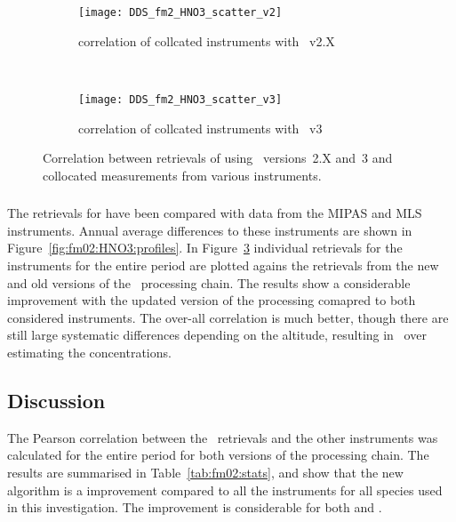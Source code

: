 \begin{figure}[htpb]
    \centering
    \begin{subfigure}[b]{0.49\textwidth}
        \texttt{[image: DDS\_fm2\_HNO3\_scatter\_v2]}
        \caption{correlation of collcated instruments with \smr~v2.X}
        \label{fig:fm02:HNO3:scatter:v2}
    \end{subfigure}
    \,
    \begin{subfigure}[b]{0.49\textwidth}
        \texttt{[image: DDS\_fm2\_HNO3\_scatter\_v3]}
        \caption{correlation of collcated instruments with \smr~v3}
        \label{fig:fm02:HNO3:scatter:v3}
    \end{subfigure}
    \caption{Correlation between retrievals of  using \smr\
    versions~2.X and~3 and collocated measurements from various instruments.}
    \label{fig:fm02:HNO3:scatter}
\end{figure}

\subsubsection{}
\label{sec:fm02:comparison:HNO3} The retrievals for  have been
compared with data from the MIPAS and MLS instruments. Annual average
differences to these instruments are shown in
Figure~\ref{fig:fm02:HNO3:profiles}. In Figure~\ref{fig:fm02:HNO3:scatter}
individual retrievals for the instruments for the entire period are plotted
agains the retrievals from the new and old versions of the \smr\ processing
chain. The results show a considerable improvement with the updated version of
the processing comapred to both considered instruments. The over-all
correlation is much better, though there are still large systematic differences
depending on the altitude, resulting in \smr\ over estimating the
concentrations.

\subsubsection{}
\label{sec:fm02:comparison:temperature}


\subsection{Discussion}
\label{sec:fm02:discussion}
The Pearson correlation between the \smr\ retrievals and the other instruments
was calculated for the entire period for both versions of the processing chain.
The results are summarised in Table~\ref{tab:fm02:stats}, and show that the
new algorithm is a improvement compared to all the instruments for all species
used in this investigation. The improvement is considerable for both \chem{O_3}
and \chem{HNO_3}.


